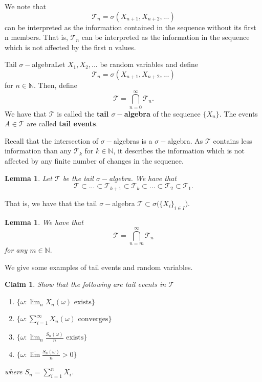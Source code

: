\documentclass[twoside]{article}
\newtheorem{lemma}[theorem]{Lemma}
\newtheorem{claim}[theorem]{Claim}
\begin{document}
We note that 
$$
\mathcal{T}_n = \sigma(X_{n+1}, X_{n+2},...)
$$
can be interpreted as the information contained in the sequence without its first n members. That is, $\mathcal{T}_n$ can be interpreted as the information in the sequence which is not affected by the first n values.

\begin{definition_exam}{Tail $\sigma-$algebra}{}Let $X_1,X_2,...$ be random variables and define 
$$
\mathcal{T}_n = \sigma(X_{n+1},X_{n+2},...)
$$
for $n \in \mathbb{N}.$ Then, define
$$
\mathcal{T} = \bigcap_{n=0}^{\infty}\mathcal{T}_n.
$$
We have that $\mathcal{T}$ is called the \textbf{tail $\sigma-$algebra} of the sequence $\{X_n\}$. The events $A \in \mathcal{T}$ are called \textbf{tail events}.
\end{definition_exam}

Recall that the intersection of $\sigma-$algebras is a $\sigma-$algebra. As $\mathcal{T}$ contains less information than any $\mathcal{T}_k$ for $k \in \mathbb{N}$, it describes the information which is not affected by any finite number of changes in the sequence. 

\begin{lemma}Let $\mathcal{T}$ be the tail $\sigma-$algebra. We have that 
$$
\mathcal{T} \subset ... \subset \mathcal{T}_{k+1} \subset \mathcal{T}_{k} \subset ... \subset \mathcal{T}_2 \subset \mathcal{T}_1.
$$
\end{lemma}

That is, we have that the tail $\sigma-$algebra $\mathcal{T} \subset \sigma\bigg(\{X_i\}_{i \in I}\bigg).$

\begin{lemma}We have that 
$$
\mathcal{T} = \bigcap_{n=m}^{\infty}\mathcal{T}_n
$$
for any $m \in \mathbb{N}.$
\end{lemma}

We give some examples of tail events and random variables.
\begin{claim} Show that the following are tail events in $\mathcal{T}$
\begin{enumerate}
\item $\{\omega: \lim_{n}X_n(\omega) \text{ exists}\}$
\item $\{\omega: \sum_{i=1}^{\infty}X_n(\omega) \text{ converges}\}$
\item $\{\omega: \lim_{n}\frac{S_n(\omega)}{n} \text{ exists}\}$
\item $\{\omega: \overline{\lim}\frac{S_n(\omega)}{n} > 0\}$
\end{enumerate}
where $S_n = \sum_{i=1}^{n}X_i$.
\end{claim}
\end{document}
